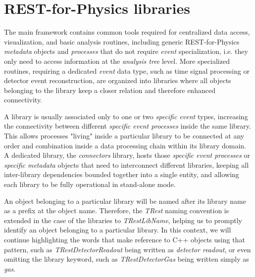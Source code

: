 \section{REST-for-Physics libraries}

\label{sec:libraries}

The main framework contains common tools required for centralized data access, visualization, and basic analysis routines, including generic REST-for-Physics \emph{metadata} objects and \emph{processes} that do not require \emph{event} specialization, i.e. they only need to access information at the \emph{analysis tree} level. More specialized routines, requiring a dedicated \emph{event} data type, such as time signal processing or detector event reconstruction, are organized into libraries where all objects belonging to the library keep a closer relation and therefore enhanced connectivity.

A library is usually associated only to one or two \emph{specific event} types, increasing the connectivity between different \emph{specific event processes} inside the same library. This allows processes "living" inside a particular library to be connected at any order and combination inside a data processing chain within its library domain. A dedicated library, the \emph{connectors} library, hosts those \emph{specific event processes} or \emph{specific metadata} objects that need to interconnect different libraries, keeping all inter-library dependencies bounded together into a single entity, and allowing each library to be fully operational in stand-alone mode.

An object belonging to a particular library will be named after its library name as a prefix at the object name. Therefore, the \emph{TRest} naming convention is extended in the case of the libraries to \emph{TRestLibName}, helping us to promptly identify an object belonging to a particular library. In this context, we will continue highlighting the words that make reference to C++ objects using that pattern, such as \emph{TRestDetectorReadout} being written as \emph{detector readout}, or even omitting the library keyword, such as \emph{TRestDetectorGas} being written simply as \emph{gas}.

